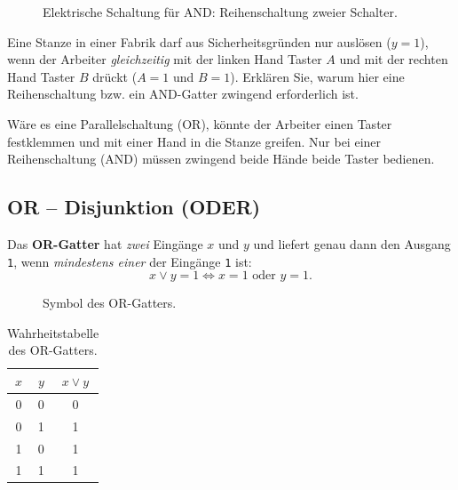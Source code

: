 \begin{figure}[H]
    \centering
    
    \caption{Elektrische Schaltung für AND: Reihenschaltung zweier Schalter.}
    \label{fig:and_schaltung}
\end{figure}

\begin{myexercise}
    Eine Stanze in einer Fabrik darf aus Sicherheitsgründen nur auslösen ($y=1$), wenn der Arbeiter \emph{gleichzeitig} mit der linken Hand Taster $A$ und mit der rechten Hand Taster $B$ drückt ($A=1$ und $B=1$).
    Erklären Sie, warum hier eine Reihenschaltung bzw. ein AND-Gatter zwingend erforderlich ist.
    \begin{myanswer}
        Wäre es eine Parallelschaltung (OR), könnte der Arbeiter einen Taster festklemmen und mit einer Hand in die Stanze greifen. Nur bei einer Reihenschaltung (AND) müssen zwingend beide Hände beide Taster bedienen.
    \end{myanswer}
\end{myexercise}

\subsection{OR -- Disjunktion (ODER)}

\begin{mydefinition}[OR-Gatter]
    Das \textbf{OR-Gatter} hat \emph{zwei} Eingänge $x$ und $y$ und liefert genau dann den Ausgang \texttt{1}, wenn \emph{mindestens einer} der Eingänge \texttt{1} ist:
    \[
        x \vee y = 1 \iff x = 1 \text{ oder } y = 1.
    \]
\end{mydefinition}

\begin{figure}[H]
    \centering
    
    \caption{Symbol des OR-Gatters.}
    \label{fig:or_gatter}
\end{figure}

\begin{table}[H]
    \centering
    \begin{tabular}{ccc}
        $x$ & $y$ & $x \vee y$ \\\midrule\midrule
        0 & 0 & 0 \\\midrule
        0 & 1 & 1 \\\midrule
        1 & 0 & 1 \\\midrule
        1 & 1 & 1 \\
    \end{tabular}
    \caption{Wahrheitstabelle des OR-Gatters.}
    \label{tab:or}
\end{table}

